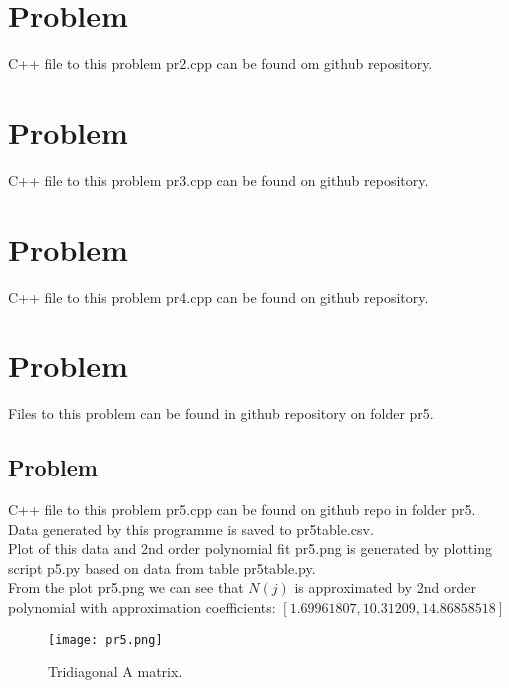 \documentclass{article}
\begin{document}
\section{Problem}
C++ file to this problem pr2.cpp can be found om github repository.
\section{Problem}
C++ file to this problem pr3.cpp can be found on github repository.
\section{Problem}
C++ file to this problem pr4.cpp can be found on github repository.
\section{Problem}
Files to this problem can be found in github repository on folder pr5.
\subsection{Problem}
C++ file to this problem pr5.cpp can be found on github repo in folder pr5.\\
Data generated by this programme is saved to pr5table.csv.\\
Plot of this data and 2nd order polynomial fit pr5.png is generated by plotting script p5.py based on data from table pr5table.py.\\
From the plot pr5.png we can see that $N(j)$ is approximated by 2nd order polynomial with approximation coefficients: $[  1.69961807, 10.31209 , 14.86858518]$

\begin{figure}
  \caption{Tridiagonal A matrix.}
  \centering
    \texttt{[image: pr5.png]}
\end{figure}
\end{document}
